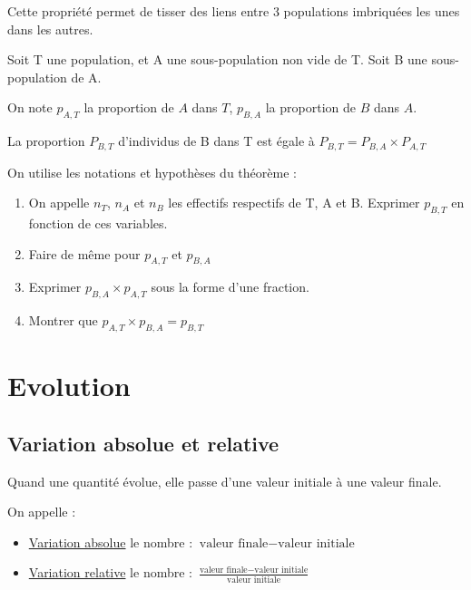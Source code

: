 \documentclass[10pt,a4paper,oneside]{book}
\begin{document}
Cette propriété permet de tisser des liens entre 3 populations imbriquées les unes dans les autres.


\begin{prop}
  Soit T une population, et A une sous-population non vide de T. Soit B une sous-population de A.

  On note $p_{A,T}$ la proportion de $A$ dans $T$, $p_{B,A}$ la proportion de $B$ dans $A$.   

  La proportion $P_{B,T}$ d'individus de B dans T est égale à  $P_{B,T}= P_{B,A} \times P_{A,T}$
\end{prop}

\begin{demo}
  On utilise les notations et hypothèses du théorème : 
  \begin{enumerate}
    \item On appelle $n_T$, $n_A$ et $n_B$ les effectifs respectifs de T, A et B. Exprimer $p_{B,T}$ en fonction de ces variables.
    \item Faire de même pour $p_{A,T}$ et $p_{B,A}$
    \item Exprimer $p_{B,A} \times p_{A,T}$ sous la forme d'une fraction. 
    \item Montrer que $p_{A,T} \times p_{B,A} = p_{B,T}$
  \end{enumerate}
\end{demo}


\section{Evolution}


\subsection{Variation absolue et relative}

Quand une quantité évolue, elle passe d'une valeur initiale à une valeur finale.

\begin{de}
  On appelle : \begin{itemize}
    \item \underline{Variation absolue} le nombre :   $\text{valeur finale} - \text{valeur initiale}$
    \item \underline{Variation relative} le nombre :   $\frac{\text{valeur finale} - \text{valeur initiale}}{\text{valeur initiale}}$
  \end{itemize}
\end{de}
\end{document}
